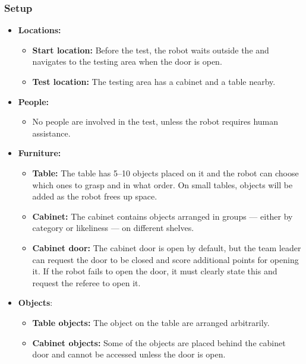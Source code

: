 \subsubsection*{Setup}
\begin{itemize}
	\item \textbf{Locations:}
		\begin{itemize}
			\item \textbf{Start location:} Before the test, the robot waits outside the \Arena{} and navigates to the testing area when the door is open.
			\item \textbf{Test location:} The testing area has a cabinet and a table nearby.
		\end{itemize}
	\item \textbf{People:}
		\begin{itemize}
			\item No people are involved in the test, unless the robot requires human assistance.
		\end{itemize}
	\item \textbf{Furniture:}
		\begin{itemize}
			\item \textbf{Table:} The table has 5--10 objects placed on it and the robot can choose which ones to grasp and in what order. On small tables, objects will be added as the robot frees up space.
			\item \textbf{Cabinet:} The cabinet contains objects arranged in groups --- either by category or likeliness --- on different shelves.
			\item \textbf{Cabinet door:} The cabinet door is open by default, but the team leader can request the door to be closed and score additional points for opening it. If the robot fails to open the door, it must clearly state this and request the referee to open it.
		\end{itemize}
	\item \textbf{Objects}:
		\begin{itemize}
			\item \textbf{Table objects:} The object on the table are arranged arbitrarily.
			\item \textbf{Cabinet objects:} Some of the objects are placed behind the cabinet door and cannot be accessed unless the door is open.
		\end{itemize}
\end{itemize}



